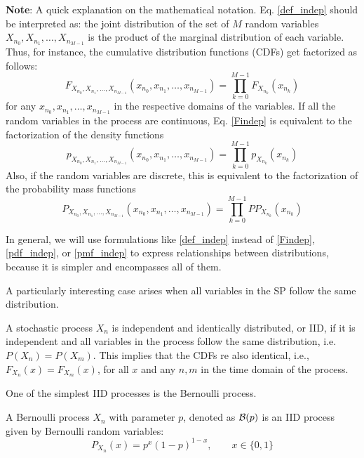 \textbf{Note}: A quick explanation on the mathematical notation. Eq. \eqref{def_indep} should be interpreted as: the joint distribution of the set of $M$ random variables $X_{n_0}, X_{n_1}, \ldots, X_{n_{M-1}}$ is the product of the marginal distribution of each variable. Thus, for instance, the cumulative distribution functions (CDFs) get factorized as follows:
\begin{equation}
\label{Findep}
F_{X_{n_0}, X_{n_1}, \ldots, X_{n_{M-1}}}(x_{n_0}, x_{n_1}, \ldots, x_{n_{M-1}}) 
	= \prod_{k=0}^{M-1} F_{X_{n_k}}(x_{n_k})
\end{equation}
for any $x_{n_0}, x_{n_1}, \ldots, x_{n_{M-1}}$ in the respective domains of the variables. If all the random variables in the process are continuous, Eq. \eqref{Findep} is equivalent to the factorization of the density functions
\begin{equation}
\label{pdf_indep}
p_{X_{n_0}, X_{n_1}, \ldots, X_{n_{M-1}}}(x_{n_0}, x_{n_1}, \ldots, x_{n_{M-1}}) 
	= \prod_{k=0}^{M-1} p_{X_{n_k}}(x_{n_k})
\end{equation}
Also, if the random variables are discrete, this is equivalent to the factorization of the probability mass functions
\begin{equation}
\label{pmf_indep}
P_{X_{n_0}, X_{n_1}, \ldots, X_{n_{M-1}}}(x_{n_0}, x_{n_1}, \ldots, x_{n_{M-1}}) 
	= \prod_{k=0}^{M-1} P P_{X_{n_k}}(x_{n_k})
\end{equation}

In general, we will use formulations like \eqref{def_indep} instead of \eqref{Findep}, \eqref{pdf_indep}, or \eqref{pmf_indep} to express relationships between distributions, because it is simpler and encompasses all of them.

A particularly interesting case arises when all variables in the SP follow the same distribution.

\begin{definition}

A stochastic process $X_n$ is independent and identically distributed, or IID, if it is independent and all variables in the process follow the same distribution, i.e. $P(X_n)=P(X_m)$. This implies that the CDFs re also identical, i.e., $F_{X_n}(x)= F_{X_m}(x)$, for all $x$ and any $n, m$ in the time domain of the process.
\end{definition}

One of the simplest IID processes is the Bernoulli process.

\begin{example}
A Bernoulli process $X_n$ with parameter $p$, denoted as ${\cal B}(p)$ is an IID process given by Bernoulli random variables:
\begin{equation}
\label{SP:Bernoulli}
P_{X_n}(x) = p^x (1-p)^{1-x},  \qquad x \in \{0, 1\}
\end{equation}
\end{example}

